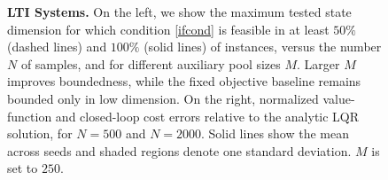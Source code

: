\documentclass[journal,twoside,web]{ieeecolor}
\newcommand{\review}{\color{black}}
\begin{document}
\begin{figure}[!t]
\begin{minipage}[t]{0.56\textwidth}
        
    \end{minipage}
    \caption{{\review \textbf{LTI Systems.} On the left, we show the maximum tested state dimension for which condition \eqref{ifcond} is feasible in at least $50\%$ (dashed lines) and $100\%$ (solid lines) of instances, versus the number $N$ of samples, and for different auxiliary pool sizes $M$. Larger $M$ improves boundedness, while the fixed objective baseline remains bounded only in low dimension. On the right, normalized value-function and closed-loop cost errors relative to the analytic LQR solution, for $N=500$ and $N=2000$. Solid lines show the mean across seeds and shaded regions denote one standard deviation. $M$ is set to $250$.}
    }
\label{fig:lti_systems}
\end{figure}
\end{document}
